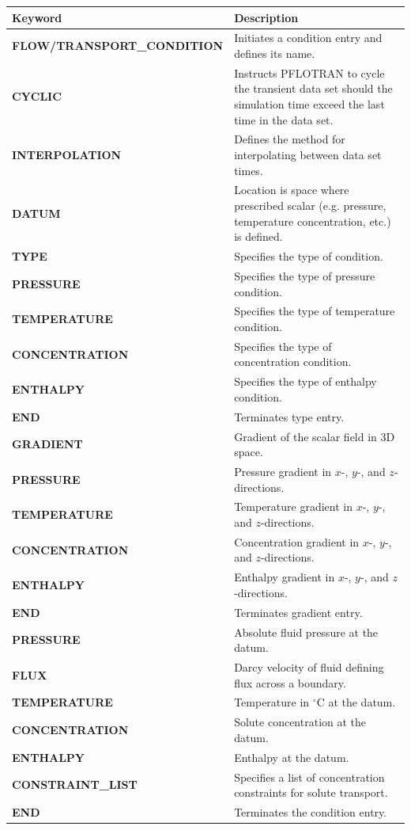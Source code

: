 \documentclass[12pt]{article}
\begin{document}
\begin{center}
\begin{tabularx}{\linewidth}{lX}
\toprule[1.5pt]
\bf Keyword & \bf Description\\
\midrule
\bf FLOW/TRANSPORT\_CONDITION & Initiates a condition entry and defines its name.\\
\midrule
\bf CYCLIC & Instructs PFLOTRAN to cycle the transient data set should the simulation time exceed the last time in the data set.\\
\midrule
\bf INTERPOLATION & Defines the method for interpolating between data set times.\\
\midrule
\bf DATUM & Location is space where prescribed scalar (e.g. pressure, temperature concentration, etc.) is defined.\\
\midrule
\bf TYPE & Specifies the type of condition.\\
\midrule
\bf PRESSURE & Specifies the type of pressure condition.\\
 \bf TEMPERATURE & Specifies the type of temperature condition.\\
    \bf CONCENTRATION & Specifies the type of concentration condition.\\
    \bf ENTHALPY & Specifies the type of enthalpy condition.\\
    \bf END & Terminates type entry.\\
\midrule\midrule
\bf GRADIENT & Gradient of the scalar field in 3D space.\\
\midrule
\bf PRESSURE & Pressure gradient in $x$-, $y$-, and $z$-directions.\\
\bf TEMPERATURE & Temperature gradient in $x$-, $y$-, and $z$-directions.\\
\bf CONCENTRATION & Concentration gradient in $x$-, $y$-, and $z$-directions.\\
\bf ENTHALPY & Enthalpy gradient in $x$-, $y$-, and $z$-directions.\\
\bf END & Terminates gradient entry.\\
\midrule\midrule
\bf PRESSURE & Absolute fluid pressure at the datum.\\
\bf FLUX & Darcy velocity of fluid defining flux across a boundary.\\
\bf TEMPERATURE & Temperature in $^\circ$C at the datum.\\
\bf CONCENTRATION & Solute concentration at the datum.\\
\bf ENTHALPY & Enthalpy at the datum.\\
\bf CONSTRAINT\_LIST & Specifies a list of concentration constraints for solute transport.\\
\bf END & Terminates the condition entry.\\
\bottomrule[1.5pt]
\end{tabularx}
\end{center}
\end{document}

